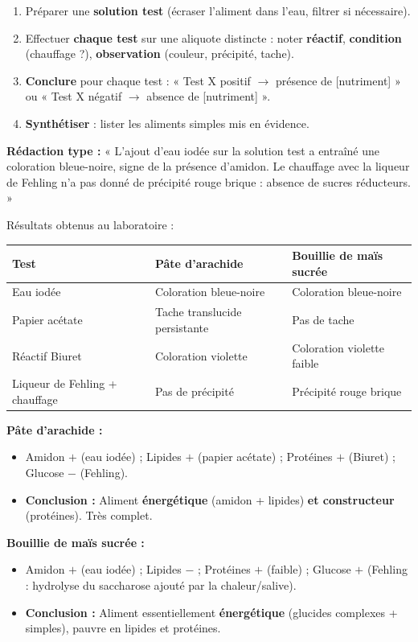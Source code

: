 \documentclass[11pt]{article}
\begin{document}
\begin{methode}
\begin{enumerate}
\item Préparer une \textbf{solution test} (écraser l'aliment dans l'eau, filtrer si nécessaire).
\item Effectuer \textbf{chaque test} sur une aliquote distincte : noter \textbf{réactif}, \textbf{condition} (chauffage ?), \textbf{observation} (couleur, précipité, tache).
\item \textbf{Conclure} pour chaque test : « Test X positif $\rightarrow$ présence de [nutriment] » ou « Test X négatif $\rightarrow$ absence de [nutriment] ».
\item \textbf{Synthétiser} : lister les aliments simples mis en évidence.
\end{enumerate}
\textbf{Rédaction type :} « L'ajout d'eau iodée sur la solution test a entraîné une coloration bleue-noire, signe de la présence d'amidon. Le chauffage avec la liqueur de Fehling n'a pas donné de précipité rouge brique : absence de sucres réducteurs. »
\end{methode}

\begin{exoresolu}
Résultats obtenus au laboratoire :
\begin{center}
\begin{tabularx}{\linewidth}{|l|X|X|}
\hline
\rowcolor{popblueL} \textbf{Test} & \textbf{Pâte d'arachide} & \textbf{Bouillie de maïs sucrée} \\
\hline
Eau iodée & Coloration bleue-noire & Coloration bleue-noire \\
\hline
Papier acétate & Tache translucide persistante & Pas de tache \\
\hline
Réactif Biuret & Coloration violette & Coloration violette faible \\
\hline
Liqueur de Fehling + chauffage & Pas de précipité & Précipité rouge brique \\
\hline
\end{tabularx}
\end{center}
\tcblower
\textbf{Pâte d'arachide :}
\begin{itemize}
\item Amidon $+$ (eau iodée) ; Lipides $+$ (papier acétate) ; Protéines $+$ (Biuret) ; Glucose $-$ (Fehling).
\item \textbf{Conclusion :} Aliment \textbf{énergétique} (amidon + lipides) \textbf{et constructeur} (protéines). Très complet.
\end{itemize}
\textbf{Bouillie de maïs sucrée :}
\begin{itemize}
\item Amidon $+$ (eau iodée) ; Lipides $-$ ; Protéines $+$ (faible) ; Glucose $+$ (Fehling : hydrolyse du saccharose ajouté par la chaleur/salive).
\item \textbf{Conclusion :} Aliment essentiellement \textbf{énergétique} (glucides complexes + simples), pauvre en lipides et protéines.
\end{itemize}
\end{exoresolu}
\end{document}
